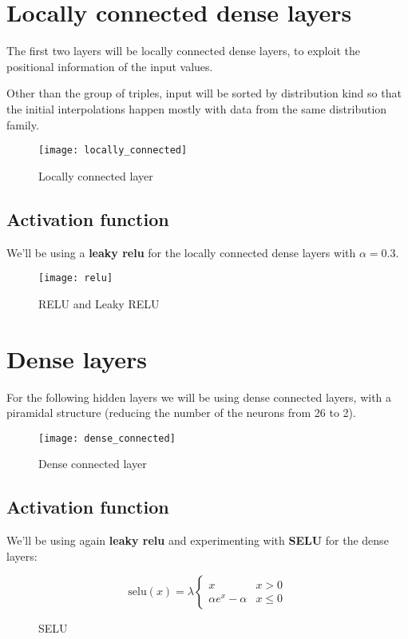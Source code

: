 \chapter{Locally connected dense layers}
The first two layers will be locally connected dense layers, to exploit the positional information of the input values.

Other than the group of triples, input will be sorted by distribution kind so that the initial interpolations happen mostly with data from the same distribution family.

\begin{figure}
	\texttt{[image: locally\_connected]}
	\caption{Locally connected layer}
\end{figure}

\section{Activation function}
We'll be using a \textbf{leaky relu} for the locally connected dense layers with \(\alpha=0.3\).

\begin{figure}
	\texttt{[image: relu]}
	\caption{RELU and Leaky RELU}
\end{figure}

\chapter{Dense layers}
For the following hidden layers we will be using dense connected layers, with a piramidal structure (reducing the number of the neurons from 26 to 2).

\begin{figure}
	\texttt{[image: dense\_connected]}
	\caption{Dense connected layer}
\end{figure}

\section{Activation function}
We'll be using again \textbf{leaky relu} and experimenting with \textbf{SELU} for the dense layers:

\begin{figure}
	\[
		\text{selu}(x) = \lambda \begin{cases}
			x                 & x > 0    \\
			\alpha e^x-\alpha & x \leq 0
		\end{cases}
	\]
	\caption{SELU}
\end{figure}

